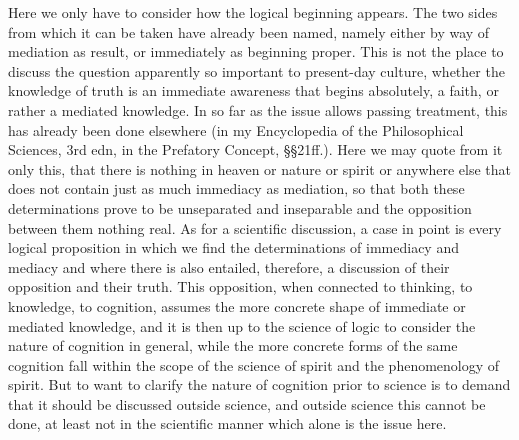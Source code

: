 Here we only have to consider
how the logical beginning appears.
The two sides from which it can be
taken have already been named,
namely either by way of mediation as result,
or immediately as beginning proper.
This is not the place to discuss the question
apparently so important to present-day culture,
whether the knowledge of truth is
an immediate awareness that begins absolutely, a faith,
or rather a mediated knowledge.
In so far as the issue allows passing treatment,
this has already been done elsewhere
(in my Encyclopedia of the Philosophical Sciences, 3rd edn,
in the Prefatory Concept, §§21ff.).
Here we may quote from it only this,
that there is nothing in heaven or nature or spirit or anywhere else
that does not contain just as much immediacy as mediation,
so that both these determinations prove
to be unseparated and inseparable
and the opposition between them nothing real.
As for a scientific discussion,
a case in point is every logical proposition
in which we find the determinations of immediacy and mediacy
and where there is also entailed, therefore,
a discussion of their opposition and their truth.
This opposition, when connected
to thinking, to knowledge, to cognition,
assumes the more concrete shape
of immediate or mediated knowledge,
and it is then up to the science of logic
to consider the nature of cognition in general,
while the more concrete forms of
the same cognition fall within the scope of
the science of spirit and the phenomenology of spirit.
But to want to clarify the nature of cognition prior to science
is to demand that it should be discussed outside science,
and outside science this cannot be done,
at least not in the scientific manner
which alone is the issue here.

